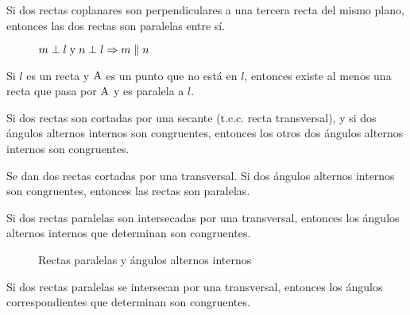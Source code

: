 \clearpage

\begin{theorem}
    Si dos rectas coplanares son perpendiculares a una tercera recta del mismo plano, entonces las dos rectas son paralelas entre sí.

    \begin{figure}[!h]
        \centering
        
        \caption{$m \perp l \;\text{y}\; n \perp l \Rightarrow m \parallel n$}
        \label{fig:theorem20}
    \end{figure}
    
\end{theorem}

\begin{theorem}
    Si $l$ es un recta y $\rm A$ es un punto que no está en $l$, entonces existe al menos una recta que pasa por $\rm A$ y es paralela a $l$.
\end{theorem}

\begin{theorem}
    Si dos rectas son cortadas por una secante (t.c.c. recta transversal), y si dos ángulos alternos internos son congruentes, entonces los otros dos ángulos alternos internos son congruentes.
\end{theorem}

\begin{theorem}
    Se dan dos rectas cortadas por una transversal. Si dos ángulos alternos internos son congruentes, entonces las rectas son paralelas.
\end{theorem}

\clearpage

\begin{theorem}
    Si dos rectas paralelas son intersecadas por una transversal, entonces los ángulos alternos internos que determinan son congruentes.
\end{theorem}

\begin{figure}[!h]
    \centering
    
    \caption{Rectas paralelas y ángulos alternos internos}
    \label{fig:theorem7}
\end{figure}

\begin{theorem}
    Si dos rectas paralelas se intersecan por una transversal, entonces los ángulos correspondientes que determinan son congruentes.
\end{theorem}

